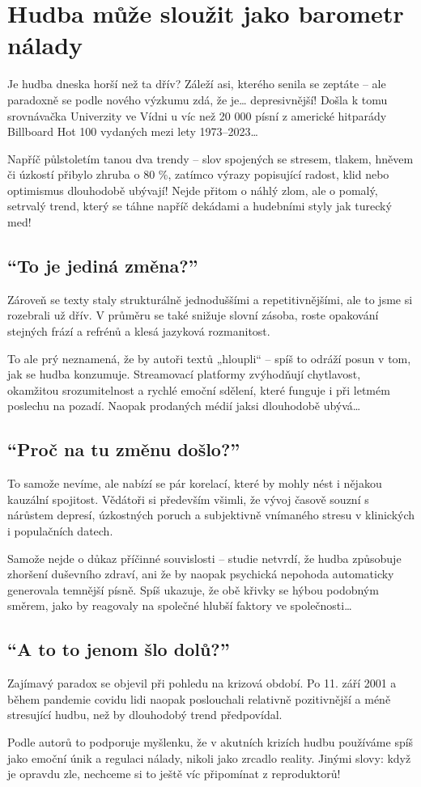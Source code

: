 \documentclass[main.tex]{subfiles}
\begin{document}
\section{Hudba může sloužit jako barometr nálady}
Je hudba dneska horší než ta dřív? Záleží asi, kterého senila se zeptáte – ale paradoxně se podle nového výzkumu zdá, že je… depresivnější! Došla k tomu srovnávačka Univerzity ve Vídni u víc než 20 000 písní z americké hitparády Billboard Hot 100 vydaných mezi lety 1973–2023…\par
Napříč půlstoletím tanou dva trendy – slov spojených se stresem, tlakem, hněvem či úzkostí přibylo zhruba o 80 \%, zatímco výrazy popisující radost, klid nebo optimismus dlouhodobě ubývají! Nejde přitom o náhlý zlom, ale o pomalý, setrvalý trend, který se táhne napříč dekádami a hudebními styly jak turecký med!
\subsection*{\enquote{To je jediná změna?}}
Zároveň se texty staly strukturálně jednoduššími a repetitivnějšími, ale to jsme si rozebrali už dřív. V průměru se také snižuje slovní zásoba, roste opakování stejných frází a refrénů a klesá jazyková rozmanitost.\par
To ale prý neznamená, že by autoři textů „hloupli“ – spíš to odráží posun v tom, jak se hudba konzumuje. Streamovací platformy zvýhodňují chytlavost, okamžitou srozumitelnost a rychlé emoční sdělení, které funguje i při letmém poslechu na pozadí. Naopak prodaných médií jaksi dlouhodobě ubývá…
\subsection*{\enquote{Proč na tu změnu došlo?}}
To samože nevíme, ale nabízí se pár korelací, které by mohly nést i nějakou kauzální spojitost. Vědátoři si především všimli, že vývoj časově souzní s nárůstem depresí, úzkostných poruch a subjektivně vnímaného stresu v klinických i populačních datech.\par
Samože nejde o důkaz příčinné souvislosti – studie netvrdí, že hudba způsobuje zhoršení duševního zdraví, ani že by naopak psychická nepohoda automaticky generovala temnější písně. Spíš ukazuje, že obě křivky se hýbou podobným směrem, jako by reagovaly na společné hlubší faktory ve společnosti…
\subsection*{\enquote{A to to jenom šlo dolů?}}
Zajímavý paradox se objevil při pohledu na krizová období. Po 11. září 2001 a během pandemie covidu lidi naopak poslouchali relativně pozitivnější a méně stresující hudbu, než by dlouhodobý trend předpovídal.\par
Podle autorů to podporuje myšlenku, že v akutních krizích hudbu používáme spíš jako emoční únik a regulaci nálady, nikoli jako zrcadlo reality. Jinými slovy: když je opravdu zle, nechceme si to ještě víc připomínat z reproduktorů!
\end{document}
